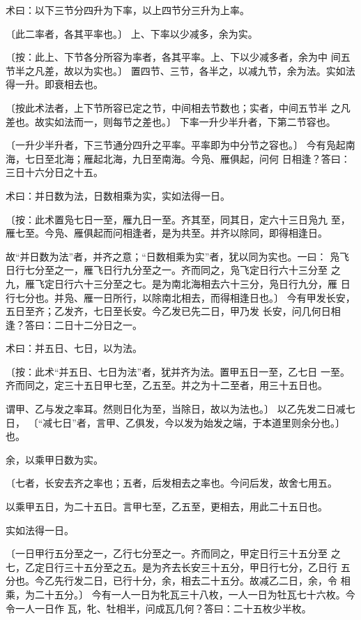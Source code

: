 \documentclass[12pt,UTF8]{ctexbook}
\begin{document}
术曰：以下三节分四升为下率，以上四节分三升为上率。

〔此二率者，各其平率也。〕 上、下率以少减多，余为实。

〔按：此上、下节各分所容为率者，各其平率。上、下以少减多者，余为中 间五节半之凡差，故以为实也。〕 置四节、三节，各半之，以减九节，余为法。实如法得一升。即衰相去也。

〔按此术法者，上下节所容已定之节，中间相去节数也；实者，中间五节半 之凡差也。故实如法而一，则每节之差也。〕 下率一升少半升者，下第二节容也。

〔一升少半升者，下三节通分四升之平率。平率即为中分节之容也。〕 今有凫起南海，七日至北海；雁起北海，九日至南海。今凫、雁俱起，问何 日相逢？答曰：三日十六分日之十五。

术曰：并日数为法，日数相乘为实，实如法得一日。

〔按：此术置凫七日一至，雁九日一至。齐其至，同其日，定六十三日凫九 至，雁七至。今凫、雁俱起而问相逢者，是为共至。并齐以除同，即得相逢日。

故“并日数为法”者，并齐之意；“日数相乘为实”者，犹以同为实也。一曰： 凫飞日行七分至之一，雁飞日行九分至之一。齐而同之，凫飞定日行六十三分至 之九，雁飞定日行六十三分至之七。是为南北海相去六十三分，凫日行九分，雁 日行七分也。并凫、雁一日所行，以除南北相去，而得相逢日也。〕 今有甲发长安，五日至齐；乙发齐，七日至长安。今乙发已先二日，甲乃发 长安，问几何日相逢？答曰：二日十二分日之一。

术曰：并五日、七日，以为法。

〔按：此术“并五日、七日为法”者，犹并齐为法。置甲五日一至，乙七日 一至。齐而同之，定三十五日甲七至，乙五至。并之为十二至者，用三十五日也。

谓甲、乙与发之率耳。然则日化为至，当除日，故以为法也。〕 以乙先发二日减七日， 〔“减七日”者，言甲、乙俱发，今以发为始发之端，于本道里则余分也。〕 也。

余，以乘甲日数为实。

〔七者，长安去齐之率也；五者，后发相去之率也。今问后发，故舍七用五。

以乘甲五日，为二十五日。言甲七至，乙五至，更相去，用此二十五日也。

实如法得一日。

〔一日甲行五分至之一，乙行七分至之一。齐而同之，甲定日行三十五分至 之七，乙定日行三十五分至之五。是为齐去长安三十五分，甲日行七分，乙日行 五分也。今乙先行发二日，已行十分，余，相去二十五分。故减乙二日，余，令 相乘，为二十五分。〕 今有一人一日为牝瓦三十八枚，一人一日为牡瓦七十六枚。今令一人一日作 瓦，牝、牡相半，问成瓦几何？答曰：二十五枚少半枚。
\end{document}
